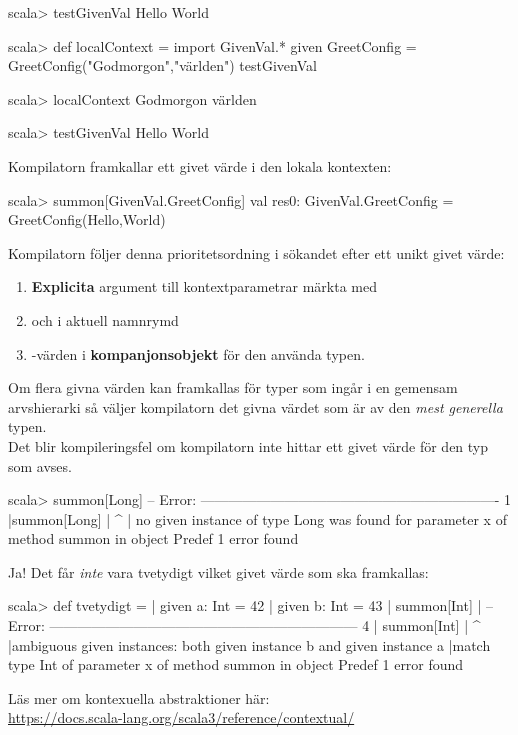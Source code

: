 \begin{REPL}
scala> testGivenVal
Hello World

scala> def localContext =
         import GivenVal.*
         given GreetConfig = GreetConfig("Godmorgon","världen")
         testGivenVal

scala> localContext
Godmorgon världen

scala> testGivenVal
Hello World
\end{REPL}


\SubtaskSolved  Kompilatorn framkallar ett givet värde i den lokala kontexten:
\begin{REPL}
scala> summon[GivenVal.GreetConfig]
val res0: GivenVal.GreetConfig = GreetConfig(Hello,World)
\end{REPL}
Kompilatorn följer denna prioritetsordning i sökandet efter ett unikt givet värde:
\begin{enumerate}
\item \textbf{Explicita} argument till kontextparametrar märkta med 
\item {} och  i aktuell namnrymd  
\item {}-värden i \textbf{kompanjonsobjekt} för den använda typen.
\end{enumerate}
Om flera givna värden kan framkallas för typer som ingår i en gemensam arvshierarki så väljer kompilatorn det givna värdet som är av den \emph{mest generella} typen.\\

\SubtaskSolved Det blir kompileringsfel om kompilatorn inte hittar ett givet värde för den typ som avses.

\begin{REPL}
scala> summon[Long]
-- Error: ----------------------------------------------------------------
1 |summon[Long]
  |            ^
  |            no given instance of type Long was found for parameter x of 
               method summon in object Predef
1 error found
\end{REPL}

\SubtaskSolved Ja! Det får \emph{inte} vara tvetydigt vilket givet värde som ska framkallas:
\begin{REPL}
scala> def tvetydigt =
     |   given a: Int = 42
     |   given b: Int = 43
     |   summon[Int]
     | 
-- Error: ------------------------------------------------------------------
4 |  summon[Int]
  |             ^
  |ambiguous given instances: both given instance b and given instance a 
  |match type Int of parameter x of method summon in object Predef
1 error found

\end{REPL}
Läs mer om kontexuella abstraktioner här:\\\url{https://docs.scala-lang.org/scala3/reference/contextual/}


